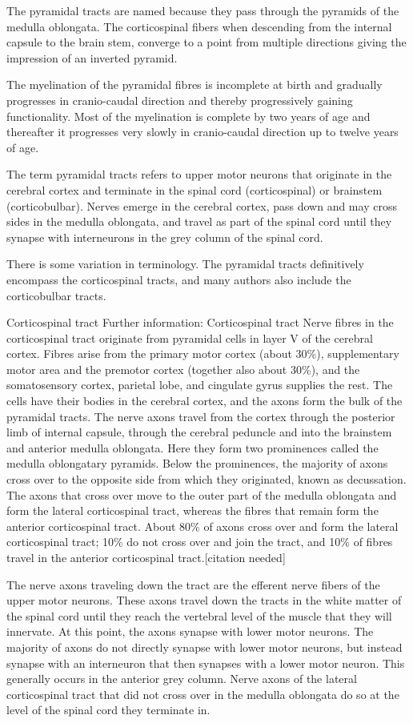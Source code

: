 The pyramidal tracts are named because they pass through the pyramids of the medulla oblongata. The corticospinal fibers when descending from the internal capsule to the brain stem, converge to a point from multiple directions giving the impression of an inverted pyramid.

The myelination of the pyramidal fibres is incomplete at birth and gradually progresses in cranio-caudal direction and thereby progressively gaining functionality. Most of the myelination is complete by two years of age and thereafter it progresses very slowly in cranio-caudal direction up to twelve years of age.

The term pyramidal tracts refers to upper motor neurons that originate in the cerebral cortex and terminate in the spinal cord (corticospinal) or brainstem (corticobulbar). Nerves emerge in the cerebral cortex, pass down and may cross sides in the medulla oblongata, and travel as part of the spinal cord until they synapse with interneurons in the grey column of the spinal cord.

There is some variation in terminology. The pyramidal tracts definitively encompass the corticospinal tracts, and many authors also include the corticobulbar tracts.

Corticospinal tract
Further information: Corticospinal tract
Nerve fibres in the corticospinal tract originate from pyramidal cells in layer V of the cerebral cortex. Fibres arise from the primary motor cortex (about 30\%), supplementary motor area and the premotor cortex (together also about 30\%), and the somatosensory cortex, parietal lobe, and cingulate gyrus supplies the rest. The cells have their bodies in the cerebral cortex, and the axons form the bulk of the pyramidal tracts. The nerve axons travel from the cortex through the posterior limb of internal capsule, through the cerebral peduncle and into the brainstem and anterior medulla oblongata. Here they form two prominences called the medulla oblongatary pyramids. Below the prominences, the majority of axons cross over to the opposite side from which they originated, known as decussation. The axons that cross over move to the outer part of the medulla oblongata and form the lateral corticospinal tract, whereas the fibres that remain form the anterior corticospinal tract. About 80\% of axons cross over and form the lateral corticospinal tract; 10\% do not cross over and join the tract, and 10\% of fibres travel in the anterior corticospinal tract.{[}citation needed{]}

The nerve axons traveling down the tract are the efferent nerve fibers of the upper motor neurons. These axons travel down the tracts in the white matter of the spinal cord until they reach the vertebral level of the muscle that they will innervate. At this point, the axons synapse with lower motor neurons. The majority of axons do not directly synapse with lower motor neurons, but instead synapse with an interneuron that then synapses with a lower motor neuron. This generally occurs in the anterior grey column. Nerve axons of the lateral corticospinal tract that did not cross over in the medulla oblongata do so at the level of the spinal cord they terminate in.

